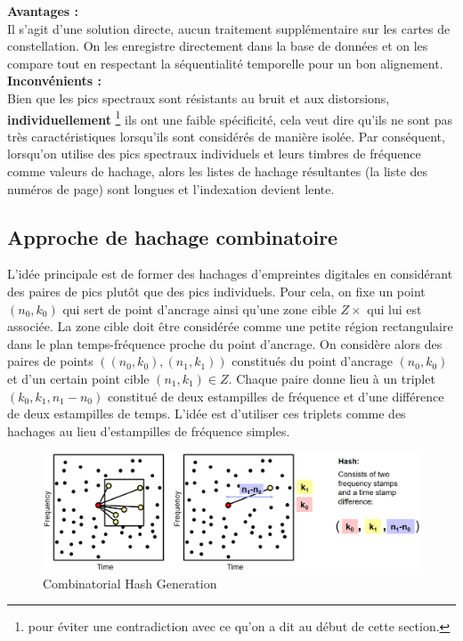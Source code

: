 \documentclass[11pt, report, french]{scrreprt}
\begin{document}
\textbf{Avantages :}\\

Il s'agit d'une solution directe, aucun traitement supplémentaire sur les cartes de constellation. On les enregistre directement dans la base de données et on les compare tout en respectant la séquentialité temporelle pour un bon alignement.\\

\textbf{Inconvénients :}\\

Bien que les pics spectraux sont résistants au bruit et aux distorsions,  \textbf{individuellement} \footnote{pour éviter une contradiction avec ce qu'on a dit au début de cette section.} ils ont une faible spécificité, cela veut dire qu'ils ne sont pas très caractéristiques lorsqu'ils sont considérés de manière isolée. Par conséquent, lorsqu'on utilise des pics spectraux individuels et leurs timbres de fréquence comme valeurs de hachage, alors les listes de hachage résultantes (la liste des numéros de page) sont longues et l'indexation devient lente.\\

\subsection{Approche de hachage combinatoire}

L'idée principale est de former des hachages d'empreintes digitales en considérant des paires de pics plutôt que des pics individuels. Pour cela, on fixe un point $(n_0,k_0)$ qui sert de point d'ancrage ainsi qu'une zone cible $Z \times$ qui lui est associée. La zone cible doit être considérée comme une petite région rectangulaire dans le plan temps-fréquence proche du point d'ancrage. On considère alors des paires de points $((n_0,k_0),(n_1,k_1))$ constitués du point d'ancrage $(n_0,k_0)$ et d'un certain point cible $(n_1,k_1) \in Z$. Chaque paire donne lieu à un triplet $(k_0,k_1,n_1-n_0)$ constitué de deux estampilles de fréquence et d'une différence de deux estampilles de temps. L'idée est d'utiliser ces triplets comme des hachages au lieu d'estampilles de fréquence simples.\\

\begin{figure}[H]
	\centering
	\includegraphics[scale=0.3]{img/hash_comb.png}
	\caption{Combinatorial Hash Generation}
\end{figure}
\end{document}
